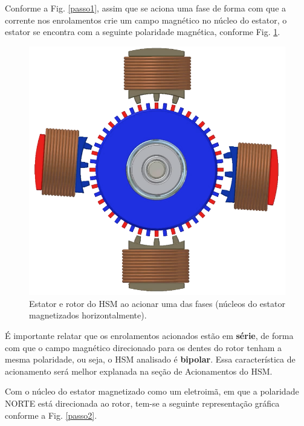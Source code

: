 	Conforme a Fig. \ref{passo1}, assim que se aciona uma fase de forma com que a corrente nos enrolamentos crie um campo magnético no núcleo do estator, o estator se encontra com a seguinte polaridade magnética, conforme Fig. \ref{acionamento1}.
	
	\begin{figure}[H]
		\centering 
		\includegraphics[scale=0.3]{images/hsm_operation/etapa3}
		\caption{Estator e rotor do HSM ao acionar uma das fases (núcleos do estator magnetizados horizontalmente).}
		\label{acionamento1}
	\end{figure}
	
	É importante relatar que os enrolamentos acionados estão em \textbf{série}, de forma com que o campo magnético direcionado para os dentes do rotor tenham a mesma polaridade, ou seja, o HSM analisado é \textbf{bipolar}. Essa característica de acionamento será melhor explanada na seção de Acionamentos do HSM.
	
	Com o núcleo do estator magnetizado como um eletroimã, em que a polaridade NORTE está direcionada ao rotor, tem-se a seguinte representação gráfica conforme a Fig. \ref{passo2}.
	
